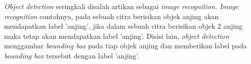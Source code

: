 \textit{Object detection} seringkali disalah artikan sebagai \textit{image recognition. Image recognition} contohnya, pada sebuah citra berisikan objek anjing akan mendapatkan label 'anjing', jika dalam sebuah citra berisikan objek 2 anjing maka tetap akan mendapatkan label 'anjing'. Disisi lain, \textit{object detection} menggambar \textit{bounding box} pada tiap objek anjing dan memberikan label pada \textit{bounding box} tersebut dengan label 'anjing'. 
\par



